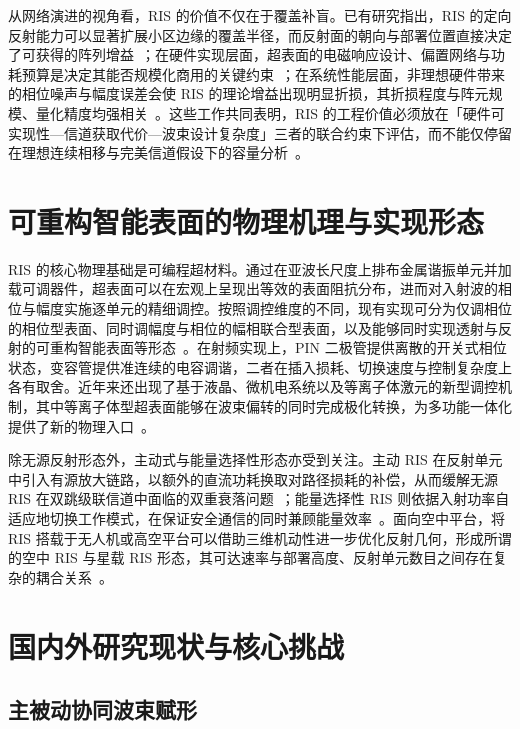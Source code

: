 从网络演进的视角看，RIS 的价值不仅在于覆盖补盲。已有研究指出，RIS 的定向反射能力可以显著扩展小区边缘的覆盖半径，而反射面的朝向与部署位置直接决定了可获得的阵列增益~\cite{zeng2021ris}；在硬件实现层面，超表面的电磁响应设计、偏置网络与功耗预算是决定其能否规模化商用的关键约束~\cite{rana2023ris}；在系统性能层面，非理想硬件带来的相位噪声与幅度误差会使 RIS 的理论增益出现明显折损，其折损程度与阵元规模、量化精度均强相关~\cite{boulogeorgos2020ris}。这些工作共同表明，RIS 的工程价值必须放在「硬件可实现性—信道获取代价—波束设计复杂度」三者的联合约束下评估，而不能仅停留在理想连续相移与完美信道假设下的容量分析~\cite{letaief2022edge}。

\section{可重构智能表面的物理机理与实现形态}

RIS 的核心物理基础是可编程超材料。通过在亚波长尺度上排布金属谐振单元并加载可调器件，超表面可以在宏观上呈现出等效的表面阻抗分布，进而对入射波的相位与幅度实施逐单元的精细调控。按照调控维度的不同，现有实现可分为仅调相位的相位型表面、同时调幅度与相位的幅相联合型表面，以及能够同时实现透射与反射的可重构智能表面等形态~\cite{rana2023ris}。在射频实现上，PIN 二极管提供离散的开关式相位状态，变容管提供准连续的电容调谐，二者在插入损耗、切换速度与控制复杂度上各有取舍。近年来还出现了基于液晶、微机电系统以及等离子体激元的新型调控机制，其中等离子体型超表面能够在波束偏转的同时完成极化转换，为多功能一体化提供了新的物理入口~\cite{magarotto2023ris}。

除无源反射形态外，主动式与能量选择性形态亦受到关注。主动 RIS 在反射单元中引入有源放大链路，以额外的直流功耗换取对路径损耗的补偿，从而缓解无源 RIS 在双跳级联信道中面临的双重衰落问题~\cite{ren2023ris}；能量选择性 RIS 则依据入射功率自适应地切换工作模式，在保证安全通信的同时兼顾能量效率~\cite{hong2026ris}。面向空中平台，将 RIS 搭载于无人机或高空平台可以借助三维机动性进一步优化反射几何，形成所谓的空中 RIS 与星载 RIS 形态，其可达速率与部署高度、反射单元数目之间存在复杂的耦合关系~\cite{zhou2021ris}。

\section{国内外研究现状与核心挑战}

\subsection{主被动协同波束赋形}

